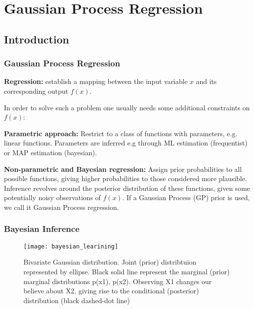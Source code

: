 \documentclass[
	8pt, %
]{beamer}
\begin{document}
\section{Gaussian Process Regression} %

\subsection{Introduction}

\begin{frame}
	\frametitle{Gaussian Process Regression}


	\textbf{Regression:} establish a mapping between the input variable $x$ and its corresponding output $f(x)$.
	\bigskip %

	In order to solve such a problem one usually needs some additional constraints on $f(x)$:

	\bigskip %
	\textbf{Parametric approach:} Restrict to a class of functions with parameters, e.g. linear functions. Parameters
	are inferred e.g through ML estimation (frequentist) or MAP estimation (bayesian).


	\bigskip %
	\textbf{Non-parametric and Bayesian regression:}
	Assign prior probabilities to all possible functions, giving higher probabilities to those considered more plausible.
	Inference revolves around the posterior distribution of these functions,
	given some potentially noisy observations of $f(x)$. If a Gaussian Process (GP) prior is used, we call it
	Gaussian Process regression.

\end{frame}


\begin{frame}
	\frametitle{Bayesian Inference}
	\begin{figure}
			\texttt{[image: bayesian\_learining]}
			\caption{Bivariate Gaussian distribution. Joint (prior) distribtuion represented by ellipse. Black solid line
			represent the marginal (prior) marginal distributions p(x1), p(x2). Observing X1 changes our believe about
			X2, giving rise to the conditional (posterior) distribution (black dashed-dot line)}
	\end{figure}

\end{frame}
\end{document}
